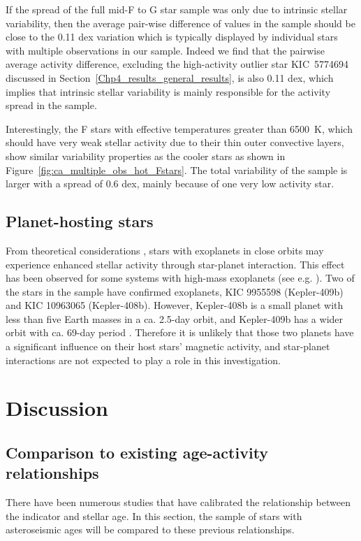 If the spread of the full mid-F to G star sample was only due to intrinsic stellar variability, then the average pair-wise difference of \Rprime values in the sample should be close to the 0.11 dex variation which is typically displayed by individual stars with multiple observations in our sample. Indeed we find that the pairwise average activity difference, excluding the high-activity outlier star KIC~5774694 discussed in Section~\ref{Chp4_results_general_results}, is also 0.11 dex, which implies that intrinsic stellar variability is mainly responsible for the activity spread in the sample.

Interestingly, the F stars with effective temperatures greater than 6500~K, which should have very weak stellar activity due to their thin outer convective layers, show similar variability properties as the cooler stars as shown in Figure~\ref{fig:ca_multiple_obs_hot_Fstars}. The total variability of the sample is larger with a spread of 0.6 dex, mainly because of one very low activity star. 

\subsection{Planet-hosting stars}
From theoretical considerations \citep{Cuntz_etal_2000}, stars with exoplanets in close orbits may experience enhanced stellar activity through star-planet interaction. This effect has been observed for some systems with high-mass exoplanets (see e.g. \citealt{Poppenhaeger_Wolk_2014,Pillitteri_etal_2015}). Two of the stars in the sample have confirmed exoplanets, KIC 9955598 (Kepler-409b) and KIC 10963065 (Kepler-408b). However, Kepler-408b is a small planet with less than five Earth masses in a ca. 2.5-day orbit, and Kepler-409b has a wider orbit with ca. 69-day period \citep{Marcy_etal_2014}. Therefore it is unlikely that those two planets have a significant influence on their host stars' magnetic activity, and star-planet interactions are not expected to play a role in this investigation.

\section{Discussion}
\label{Chp4_discussion}

\subsection{Comparison to existing age-activity relationships}
\label{Chp4_discus_previous_relations}
There have been numerous studies that have calibrated the relationship between the \Rprime indicator and stellar age. In this section, the sample of stars with asteroseismic ages will be compared to these previous relationships.

